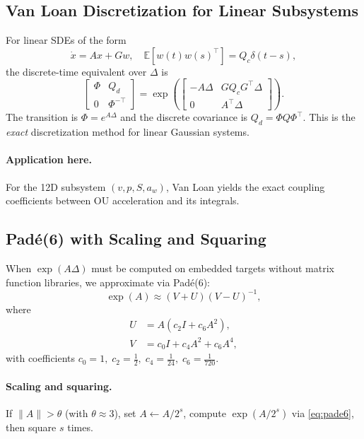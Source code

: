 \documentclass[10pt]{extarticle}
\begin{document}
\subsection{Van Loan Discretization for Linear Subsystems}
For linear SDEs of the form
\[
\dot x = A x + G w,\quad \mathbb{E}[w(t)w(s)^\top] = Q_c\delta(t-s),
\]
the discrete-time equivalent over $\Delta$ is
\begin{equation}
\begin{bmatrix}
\Phi & Q_d\\ 0 & \Phi^{-\top}
\end{bmatrix}
=
\exp\!\left(
\begin{bmatrix}
-A\Delta & GQ_cG^\top\Delta\\
0 & A^\top\Delta
\end{bmatrix}
\right).
\label{eq:van-loan-final}
\end{equation}
The transition is $\Phi=e^{A\Delta}$ and the discrete covariance is
$Q_d=\Phi Q\Phi^\top$. This is the \emph{exact} discretization method
for linear Gaussian systems.

\paragraph{Application here.}
For the 12D subsystem $(v,p,S,a_w)$, Van Loan yields the exact coupling
coefficients between OU acceleration and its integrals. 

\subsection{Pad\'e(6) with Scaling and Squaring}
When $\exp(A\Delta)$ must be computed on embedded targets without matrix
function libraries, we approximate via Pad\'e(6):
\begin{equation}
\exp(A) \approx (V+U)(V-U)^{-1},
\label{eq:pade6}
\end{equation}
where
\begin{align}
U &= A\left(c_2 I + c_6 A^2\right),\\
V &= c_0 I + c_4 A^2 + c_6 A^4,
\end{align}
with coefficients $c_0=1,\;c_2=\tfrac{1}{2},\;c_4=\tfrac{1}{24},\;c_6=\tfrac{1}{720}$.

\paragraph{Scaling and squaring.}
If $\|A\|>\theta$ (with $\theta\approx 3$), set $A\leftarrow A/2^s$,
compute $\exp(A/2^s)$ via \eqref{eq:pade6}, then square $s$ times.
\end{document}
